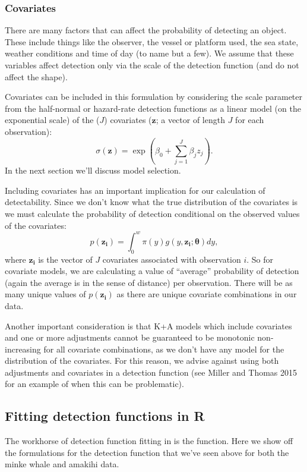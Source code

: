 \documentclass[article]{jss}
\begin{document}
\subsubsection{Covariates}\label{covariates}

There are many factors that can affect the probability of detecting an
object. These include things like the observer, the vessel or platform
used, the sea state, weather conditions and time of day (to name but a
few). We assume that these variables affect detection only via the scale
of the detection function (and do not affect the shape).

Covariates can be included in this formulation by considering the scale
parameter from the half-normal or hazard-rate detection functions as a
linear model (on the exponential scale) of the (\(J\)) covariates
(\(\mathbf{z}\); a vector of length \(J\) for each observation): \[
\sigma(\mathbf{z}) = \exp(\beta_0 + \sum_{j=1}^J \beta_j z_j).
\] In the next section we'll discuss model selection.

Including covariates has an important implication for our calculation of
detectability. Since we don't know what the true distribution of the
covariates is we must calculate the probability of detection conditional
on the observed values of the covariates: \[
p(\mathbf{z_i}) = \int_0^w \pi(y) g(y, \mathbf{z_i}; \boldsymbol{\theta}) dy,
\] where \(\mathbf{z_i}\) is the vector of \(J\) covariates associated
with observation \(i\). So for covariate models, we are calculating a
value of ``average'' probability of detection (again the average is in
the sense of distance) per observation. There will be as many unique
values of \(p(\mathbf{z_i})\) as there are unique covariate combinations
in our data.

Another important consideration is that K+A models which include
covariates and one or more adjustments cannot be guaranteed to be
monotonic non-increasing for all covariate combinations, as we don't
have any model for the distribution of the covariates. For this reason,
we advise against using both adjustments and covariates in a detection
function (see Miller and Thomas 2015 for an example of when this can be
problematic).

\subsection{Fitting detection functions in
R}\label{fitting-detection-functions-in-r}

The workhorse of detection function fitting in  is the
 function. Here we show off the formulations for the detection
function that we've seen above for both the minke whale and amakihi
data.
\end{document}
